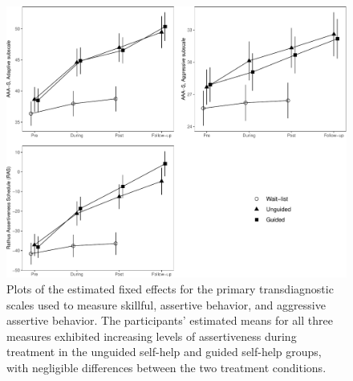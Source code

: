 \documentclass[preprint,
3p]{elsarticle} %
\begin{document}
\begin{figure}
\includegraphics[width=1\linewidth]{r2fu-article_files/figure-latex/emm.primary.plots-1} \caption{Plots of the estimated fixed effects for the primary transdiagnostic scales used to measure skillful, assertive behavior, and aggressive assertive behavior. The participants’ estimated means for all three measures exhibited increasing levels of assertiveness during treatment in the unguided self-help and guided self-help groups, with negligible differences between the two treatment conditions.}\label{fig:emm.primary.plots}
\end{figure}
\end{document}
